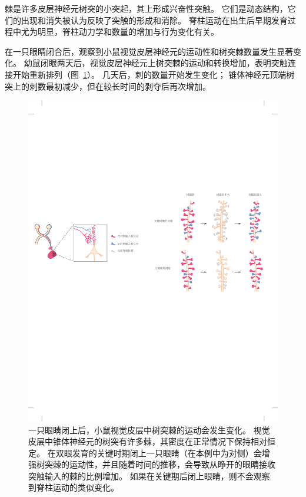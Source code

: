 棘是许多皮层神经元树突的小突起，其上形成兴奋性突触。
它们是动态结构，它们的出现和消失被认为反映了突触的形成和消除。
脊柱运动在出生后早期发育过程中尤为明显，脊柱动力学和数量的增加与行为变化有关。


在一只眼睛闭合后，观察到小鼠视觉皮层神经元的运动性和树突棘数量发生显著变化。
幼鼠闭眼两天后，视觉皮层神经元上树突棘的运动和转换增加，表明突触连接开始重新排列（图~\ref{fig:49_10}）。
几天后，刺的数量开始发生变化；
锥体神经元顶端树突上的刺数最初减少，但在较长时间的剥夺后再次增加。


\begin{figure}[htbp]
	\centering
	\includegraphics[width=1.0\linewidth]{chap49/fig_49_10}
	\caption{一只眼睛闭上后，小鼠视觉皮层中树突棘的运动会发生变化。
		视觉皮层中锥体神经元的树突有许多棘，其密度在正常情况下保持相对恒定。
		在双眼发育的关键时期闭上一只眼睛（在本例中为对侧）会增强树突棘的运动性，并且随着时间的推移，会导致从睁开的眼睛接收突触输入的棘的比例增加。
		如果在关键期后闭上眼睛，则不会观察到脊柱运动的类似变化\cite{oray2004dendritic}。}
	\label{fig:49_10}
\end{figure}


